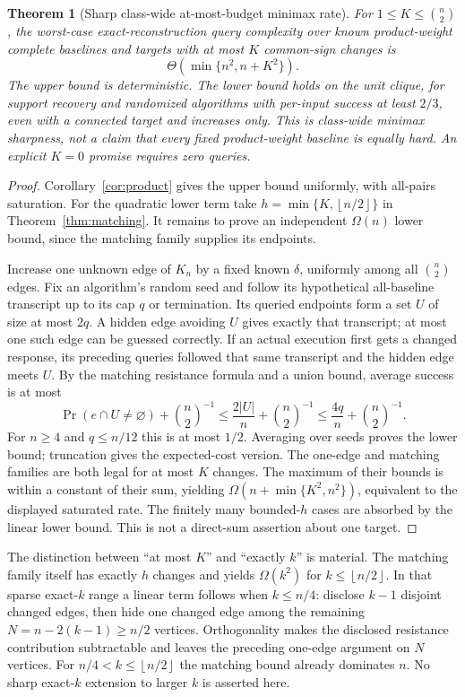 \documentclass[11pt,letterpaper]{article}
\newtheorem{theorem}{Theorem}
\newcommand{\floor}[1]{\left\lfloor #1\right\rfloor}
\begin{document}
\begin{theorem}[Sharp class-wide at-most-budget minimax rate]\label{thm:minimax}
For $1\le K\le\binom n2$, the worst-case exact-reconstruction query complexity over known product-weight complete baselines and targets with at most $K$ common-sign changes is
\[
 \Theta(\min\{n^2,n+K^2\}).
\]
The upper bound is deterministic. The lower bound holds on the unit clique, for support recovery and randomized algorithms with per-input success at least $2/3$, even with a connected target and increases only. This is class-wide minimax sharpness, not a claim that every fixed product-weight baseline is equally hard. An explicit $K=0$ promise requires zero queries.
\end{theorem}
\begin{proof}
Corollary~\ref{cor:product} gives the upper bound uniformly, with all-pairs saturation. For the quadratic lower term take $h=\min\{K,\floor{n/2}\}$ in Theorem~\ref{thm:matching}. It remains to prove an independent $\Omega(n)$ lower bound, since the matching family supplies its endpoints.

Increase one unknown edge of $K_n$ by a fixed known $\delta$, uniformly among all $\binom n2$ edges. Fix an algorithm's random seed and follow its hypothetical all-baseline transcript up to its cap $q$ or termination. Its queried endpoints form a set $U$ of size at most $2q$. A hidden edge avoiding $U$ gives exactly that transcript; at most one such edge can be guessed correctly. If an actual execution first gets a changed response, its preceding queries followed that same transcript and the hidden edge meets $U$. By the matching resistance formula and a union bound, average success is at most
\[
 \Pr(e\cap U\ne\varnothing)+\binom n2^{-1}
 \le\frac{2|U|}{n}+\binom n2^{-1}
 \le\frac{4q}{n}+\binom n2^{-1}.
\]
For $n\ge4$ and $q\le n/12$ this is at most $1/2$. Averaging over seeds proves the lower bound; truncation gives the expected-cost version. The one-edge and matching families are both legal for at most $K$ changes. The maximum of their bounds is within a constant of their sum, yielding $\Omega(n+\min\{K^2,n^2\})$, equivalent to the displayed saturated rate. The finitely many bounded-$h$ cases are absorbed by the linear lower bound. This is not a direct-sum assertion about one target.
\end{proof}

The distinction between ``at most $K$'' and ``exactly $k$'' is material. The matching family itself has exactly $h$ changes and yields $\Omega(k^2)$ for $k\le\floor{n/2}$. In that sparse exact-$k$ range a linear term follows when $k\le n/4$: disclose $k-1$ disjoint changed edges, then hide one changed edge among the remaining $N=n-2(k-1)\ge n/2$ vertices. Orthogonality makes the disclosed resistance contribution subtractable and leaves the preceding one-edge argument on $N$ vertices. For $n/4<k\le\floor{n/2}$ the matching bound already dominates $n$. No sharp exact-$k$ extension to larger $k$ is asserted here.
\end{document}
